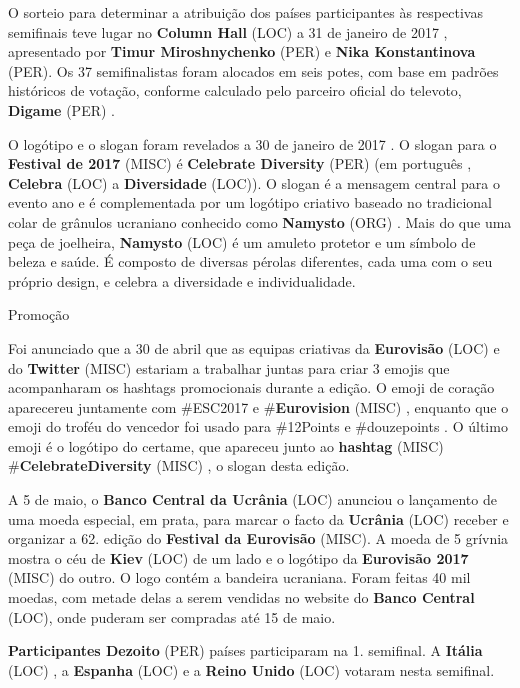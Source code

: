 \documentclass[12pt,a4paper]{article}
\begin{document}
O sorteio para determinar a atribuição dos países participantes às respectivas semifinais teve lugar no \textbf{Column Hall} (LOC) a 31 de janeiro de 2017 , apresentado por \textbf{Timur Miroshnychenko} (PER) e \textbf{Nika Konstantinova} (PER). Os 37 semifinalistas foram alocados em seis potes, com base em padrões históricos de votação, conforme calculado pelo parceiro oficial do televoto, \textbf{Digame} (PER) .

O logótipo e o slogan foram revelados a 30 de janeiro de 2017 . O slogan para o \textbf{Festival de 2017} (MISC) é \textbf{Celebrate Diversity} (PER) (em português , \textbf{Celebra} (LOC) a \textbf{Diversidade} (LOC)). O slogan é a mensagem central para o evento ano e é complementada por um logótipo criativo baseado no tradicional colar de grânulos ucraniano conhecido como \textbf{Namysto} (ORG) . Mais do que uma peça de joelheira, \textbf{Namysto} (LOC) é um amuleto protetor e um símbolo de beleza e saúde. É composto de diversas pérolas diferentes, cada uma com o seu próprio design, e celebra a diversidade e individualidade.



Promoção

Foi anunciado que a 30 de abril que as equipas criativas da \textbf{Eurovisão} (LOC) e do \textbf{Twitter} (MISC) estariam a trabalhar juntas para criar 3 emojis que acompanharam os hashtags promocionais durante a edição. O emoji de coração aparecereu juntamente com \#ESC2017 e \#\textbf{Eurovision} (MISC) , enquanto que o emoji do troféu do vencedor foi usado para \#12Points e \#douzepoints . O último emoji é o logótipo do certame, que apareceu junto ao \textbf{hashtag} (MISC) \#\textbf{CelebrateDiversity} (MISC) , o slogan desta edição.

A 5 de maio, o \textbf{Banco Central da Ucrânia} (LOC) anunciou o lançamento de uma moeda especial, em prata, para marcar o facto da \textbf{Ucrânia} (LOC) receber e organizar a 62. edição do \textbf{Festival da Eurovisão} (MISC). A moeda de 5 grívnia mostra o céu de \textbf{Kiev} (LOC) de um lado e o logótipo da \textbf{Eurovisão 2017} (MISC) do outro. O logo contém a bandeira ucraniana. Foram feitas 40 mil moedas, com metade delas a serem vendidas no website do \textbf{Banco Central} (LOC), onde puderam ser compradas até 15 de maio.



\textbf{Participantes Dezoito} (PER) países participaram na 1. semifinal. A \textbf{Itália} (LOC) , a \textbf{Espanha} (LOC) e a \textbf{Reino Unido} (LOC) votaram nesta semifinal.
\end{document}
